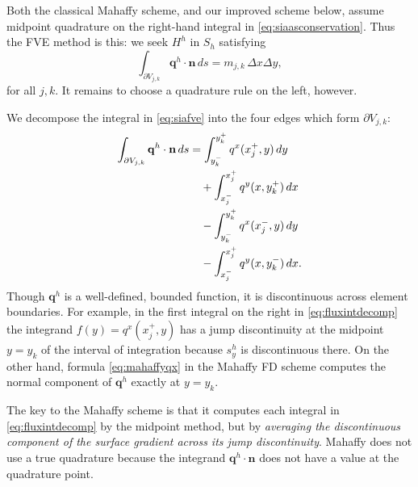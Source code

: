 \documentclass[twocolumn,letterpaper]{igs}
\newcommand\bn{\mathbf{n}}
\newcommand\bq{\mathbf{q}}
\begin{document}
Both the classical Mahaffy scheme, and our improved scheme below, assume midpoint quadrature on the right-hand integral in \eqref{eq:siaasconservation}.  Thus the FVE method is this: we seek $H^h$ in $S_h$ satisfying
\begin{equation}
  \int_{\partial V_{j,k}} \bq^h \cdot \bn\,ds = m_{j,k}\, \Delta x \Delta y, \label{eq:siafve}
\end{equation}
for all $j,k$.  It remains to choose a quadrature rule on the left, however.

We decompose the integral in \eqref{eq:siafve} into the four edges which form $\partial V_{j,k}$:
\begin{align}
\int_{\partial V_{j,k}} \bq^h \cdot \bn\,ds &= \int_{y_k^-}^{y_k^+} q^x(x_j^+,y)\,dy \label{eq:fluxintdecomp} \\
&\quad + \int_{x_j^-}^{x_j^+} q^y(x,y_k^+)\,dx \notag \\
&\quad - \int_{y_k^-}^{y_k^+} q^x(x_j^-,y)\,dy \notag \\
&\quad - \int_{x_j^-}^{x_j^+} q^y(x,y_k^-)\,dx. \notag
\end{align}
Though $\bq^h$ is a well-defined, bounded function, it is discontinuous across element boundaries.  For example, in the first integral on the right in \eqref{eq:fluxintdecomp} the integrand $f(y) = q^x(x_j^+,y)$ has a jump discontinuity at the midpoint $y=y_k$ of the interval of integration because $s^h_y$ is discontinuous there.  On the other hand, formula \eqref{eq:mahaffyqx} in the Mahaffy FD scheme computes the normal component of $\bq^h$ exactly at $y=y_k$.

The key to the Mahaffy scheme is that it computes each integral in \eqref{eq:fluxintdecomp} by the midpoint method, but by \emph{averaging the discontinuous component of the surface gradient across its jump discontinuity}.  Mahaffy does not use a true quadrature because the integrand $\bq^h\cdot \bn$ does not have a value at the quadrature point.
\end{document}
